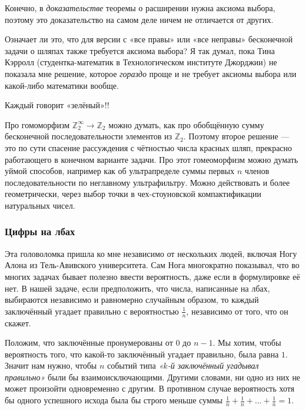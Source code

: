 Конечно, в \emph{доказательстве} теоремы о расширении нужна аксиома выбора, поэтому это доказательство на самом деле ничем не отличается от других.

Означает ли это, что для версии с «все правы» или «все неправы» бесконечной задачи о шляпах также требуется аксиома выбора?
Я так думал, пока Тина Кэрролл (студентка-математик в Технологическом институте Джорджии) не показала мне решение, которое \emph{гораздо} проще и не требует аксиомы выбора или какой-либо математики вообще.

Каждый говорит «зелёный»!!

\begin{addedbytheeditors}
Про гомоморфизм $\mathbb{Z}_2^\infty\to \mathbb{Z}_2$ можно думать, как про обобщённую сумму бесконечной последовательности элементов из $\mathbb{Z}_2$.
Поэтому второе решение --- это по сути спасение рассуждения с чётностью числа красных шляп, прекрасно работающего в конечном варианте задачи.
Про этот гомеоморфизм можно думать уймой способов, например как об ультрапределе суммы первых $n$ членов последовательности по неглавному ультрафильтру.
Можно действовать и более геометрически, через выбор точки в чех-стоуновской компактификации натуральных чисел.\pr
\end{addedbytheeditors}


\subsubsection*{Цифры на лбах}

Эта головоломка пришла ко мне независимо от нескольких людей, включая Ногу Алона из Тель-Авивского университета.
Сам Нога многократно показывал, что во многих задачах бывает полезно ввести вероятность, даже если в формулировке её нет.
В нашей задаче, если предположить, что числа, написанные на лбах, выбираются независимо и равномерно случайным образом, то каждый заключённый угадает правильно с вероятностью $\tfrac1n$, независимо от того, что он скажет.

Положим, что заключённые пронумерованы от $0$ до $n-1$.
Мы хотим, чтобы вероятность того, что какой-то заключённый угадает правильно, была равна $1$.
Значит нам нужно, чтобы $n$ событий типа \emph{«$k$-й заключённый угадывал правильно»} были бы взаимоисключающими.
Другими словами, ни одно из них не может произойти одновременно с другим.
В противном случае вероятность хотя бы одного успешного исхода была бы строго меньше суммы $\tfrac1n + \tfrac1n + \dots + \tfrac1n = 1$.

